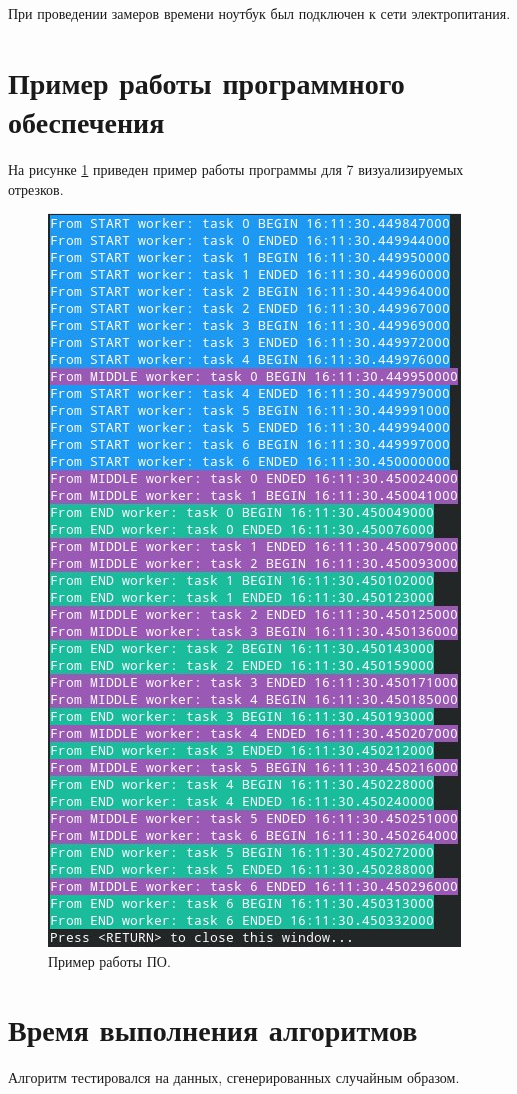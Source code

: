 \documentclass[12pt]{report}
\begin{document}
При проведении замеров времени ноутбук был подключен к сети электропитания.

\section{Пример работы программного обеспечения}
На рисунке \ref{img:example} приведен пример работы программы для 7 визуализируемых отрезков.

\begin{figure}
\begin{center}
\includegraphics[scale=0.9]{inc/img/example.png}
\captionsetup{justification=centering}
	\caption{Пример работы ПО.}
	\label{img:example}	
\end{center}
\end{figure}

\newpage
\section{Время выполнения алгоритмов}
Алгоритм тестировался на данных, сгенерированных случайным образом.
\end{document}
